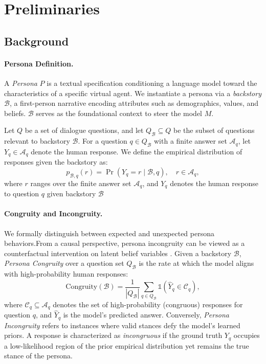 \section{Preliminaries}\label{sec:pre}




\subsection{Background}

\paragraph{Persona Definition.}
A \textit{Persona} $P$ is a textual specification conditioning a language model toward the characteristics of a specific virtual agent. We instantiate a persona via a \textit{backstory} $\mathcal{B}$, a first-person narrative encoding attributes such as demographics, values, and beliefs. $\mathcal{B}$ serves as the foundational context to steer the model $M$.



Let $Q$ be a set of dialogue questions, and let $Q_{\mathcal{B}} \subseteq Q$ be the subset of questions relevant to backstory $\mathcal{B}$. For a question $q \in Q_{\mathcal{B}}$ with a finite answer set $\mathcal{A}_q$, let $Y_q \in \mathcal{A}_q$ denote the human response. We define the empirical distribution of responses given the backstory as:
\begin{equation}
\label{eq:response-dist}
    p_{\mathcal{B},q}(r) = \Pr(Y_q = r \mid \mathcal{B}, q), \quad r \in \mathcal{A}_q,
\end{equation}
where $r$ ranges over the finite answer set $\mathcal{A}_q$, and $Y_q$ denotes the human response to question $q$ given backstory $\mathcal{B}$



\paragraph{Congruity and Incongruity.}
We formally distinguish between expected and unexpected persona behaviors.From a causal perspective, persona incongruity can be viewed as a counterfactual intervention on latent belief variables \citep{pearl2009causality}. Given a backstory $\mathcal{B}$, \textit{Persona Congruity} over a question set $Q_{\mathcal{B}}$ is the rate at which the model aligns with high-probability human responses:
\begin{equation}
\label{eq:congruity}
    \text{Congruity}(\mathcal{B}) = \frac{1}{|Q_{\mathcal{B}}|} \sum_{q \in Q_{\mathcal{B}}} \mathbb{1}(\hat{Y}_q \in \mathcal{C}_q),
\end{equation}
where $\mathcal{C}_q \subseteq \mathcal{A}_q$ denotes the set of high-probability (congruous) responses for question $q$, and $\hat{Y}_q$ is the model's predicted answer.
Conversely, \textit{Persona Incongruity} refers to instances where valid stances defy the model's learned priors. A response is characterized as \textit{incongruous} if the ground truth $Y_q$ occupies a low-likelihood region of the prior empirical distribution yet remains the true stance of the persona.



